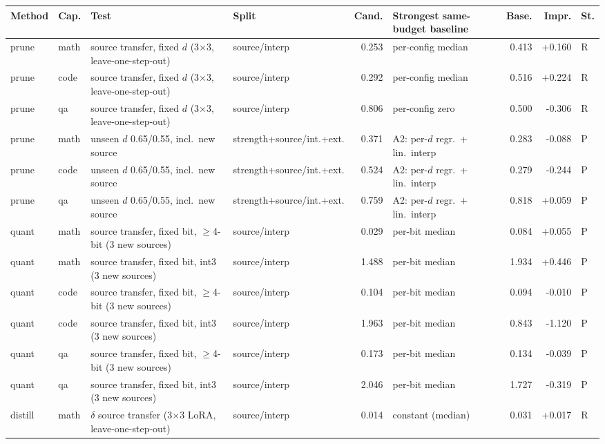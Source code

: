 \begin{table}
\centering
\small
\setlength{\tabcolsep}{3pt}
\begin{tabular}{@{}llp{4.6cm}lrp{3.2cm}rrl@{}}
\toprule
Method & Cap. & Test & Split & Cand. & Strongest same-budget baseline & Base. & Impr. & St. \\
\midrule
prune & math & source transfer, fixed $d$ (3$\times$3, leave-one-step-out) & source/interp & 0.253 & per-config median & 0.413 & +0.160 & R \\
prune & code & source transfer, fixed $d$ (3$\times$3, leave-one-step-out) & source/interp & 0.292 & per-config median & 0.516 & +0.224 & R \\
prune & qa & source transfer, fixed $d$ (3$\times$3, leave-one-step-out) & source/interp & 0.806 & per-config zero & 0.500 & -0.306 & R \\
prune & math & unseen $d$ 0.65/0.55, incl.\ new source & strength+source/int.+ext. & 0.371 & A2: per-$d$ regr.\ + lin.\ interp & 0.283 & -0.088 & P \\
prune & code & unseen $d$ 0.65/0.55, incl.\ new source & strength+source/int.+ext. & 0.524 & A2: per-$d$ regr.\ + lin.\ interp & 0.279 & -0.244 & P \\
prune & qa & unseen $d$ 0.65/0.55, incl.\ new source & strength+source/int.+ext. & 0.759 & A2: per-$d$ regr.\ + lin.\ interp & 0.818 & +0.059 & P \\
\midrule
quant & math & source transfer, fixed bit, $\ge$4-bit (3 new sources) & source/interp & 0.029 & per-bit median & 0.084 & +0.055 & P \\
quant & math & source transfer, fixed bit, int3 (3 new sources) & source/interp & 1.488 & per-bit median & 1.934 & +0.446 & P \\
quant & code & source transfer, fixed bit, $\ge$4-bit (3 new sources) & source/interp & 0.104 & per-bit median & 0.094 & -0.010 & P \\
quant & code & source transfer, fixed bit, int3 (3 new sources) & source/interp & 1.963 & per-bit median & 0.843 & -1.120 & P \\
quant & qa & source transfer, fixed bit, $\ge$4-bit (3 new sources) & source/interp & 0.173 & per-bit median & 0.134 & -0.039 & P \\
quant & qa & source transfer, fixed bit, int3 (3 new sources) & source/interp & 2.046 & per-bit median & 1.727 & -0.319 & P \\
\midrule
distill & math & $\delta$ source transfer (3$\times$3 LoRA, leave-one-step-out) & source/interp & 0.014 & constant (median) & 0.031 & +0.017 & R \\

\end{tabular}
\end{table}
